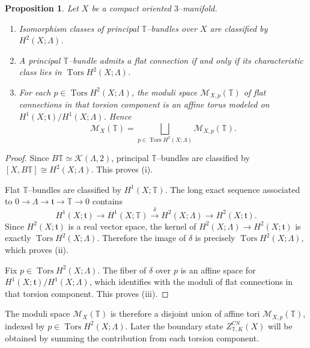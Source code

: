 \documentclass[12pt]{amsart}
\numberwithin{equation}{section}
\newtheorem{prop}[theorem]{Proposition}
\DeclareMathOperator{\Tors}{Tors}
\begin{document}
\begin{prop}
\label{prop:toral-flat-bundles-rigorous}
Let $X$ be a compact oriented $3$--manifold.

\begin{enumerate}
\item[\textup{(i)}]
Isomorphism classes of principal $\mathbb T$--bundles over $X$ are classified by
$H^2(X;\Lambda)$.

\item[\textup{(ii)}]
A principal $\mathbb T$--bundle admits a flat connection if and only if its
characteristic class lies in $\Tors H^2(X;\Lambda)$.

\item[\textup{(iii)}]
For each $p\in\Tors H^2(X;\Lambda)$, the moduli space
$\mathcal M_{X,p}(\mathbb T)$ of flat connections in that torsion component is an affine torus modeled on $H^1(X;\mathfrak t)/H^1(X;\Lambda)$.
Hence
\[
\mathcal M_X(\mathbb T)
=
\bigsqcup_{p\in \Tors H^2(X;\Lambda)}\mathcal M_{X,p}(\mathbb T).
\]
\end{enumerate}
\end{prop}

\begin{proof}
Since $B\mathbb T\simeq \mathcal K(\Lambda,2)$, principal $\mathbb T$--bundles are
classified by $[X,B\mathbb T]\cong H^2(X;\Lambda).$ This proves \textup{(i)}.

Flat $\mathbb T$--bundles are classified by $H^1(X;\mathbb T)$.
The long exact sequence associated to
$0\to\Lambda\to\mathfrak t\to\mathbb T\to 0$
contains
\[
H^1(X;\mathfrak t)\to H^1(X;\mathbb T)\xrightarrow{\delta} H^2(X;\Lambda)\to H^2(X;\mathfrak t).
\]
Since $H^2(X;\mathfrak t)$ is a real vector space, the kernel of
$H^2(X;\Lambda)\to H^2(X;\mathfrak t)$ is exactly
$\Tors H^2(X;\Lambda)$.
Therefore the image of $\delta$ is precisely $\Tors H^2(X;\Lambda)$,
which proves \textup{(ii)}.

Fix $p\in\Tors H^2(X;\Lambda)$. The fiber of $\delta$ over $p$ is an affine
space for $H^1(X;\mathfrak t)/H^1(X;\Lambda)$, which identifies with the moduli of flat connections in that torsion component. This proves \textup{(iii)}.
\end{proof}

The moduli space \(\mathcal M_X(\mathbb T)\) is therefore a disjoint union of affine tori \(\mathcal M_{X,p}(\mathbb T)\), indexed by
\(p\in \Tors H^2(X;\Lambda)\). Later the boundary state
\(Z^{CS}_{\mathbb T,K}(X)\) will be obtained by summing the contribution from each
torsion component.
\end{document}
